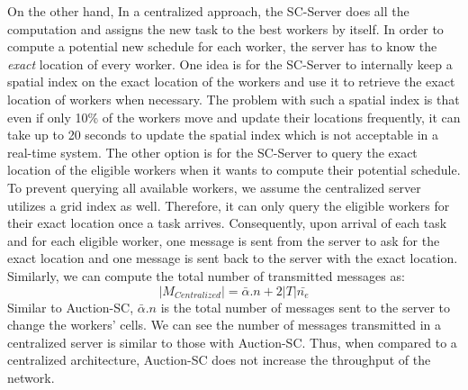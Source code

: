 On the other hand, In a centralized approach, the SC-Server does all the computation and assigns the new task to the best workers by itself. In order to compute a potential new schedule for each worker, the server has to know the \textit{exact} location of every worker. One idea is for the SC-Server to internally keep a spatial index on the exact location of the workers and use it to retrieve the exact location of workers when necessary. The problem with such a spatial index is that even if only 10\% of the workers move and update their locations frequently, it can take up to 20 seconds to update the spatial index \cite{Akdogan14} which is not acceptable in a real-time system. The other option is for the SC-Server to query the exact location of the eligible workers when it wants to compute their potential schedule. To prevent querying all available workers, we assume the centralized server utilizes a grid index as well. Therefore, it can only query the eligible workers for their exact location once a task arrives. Consequently, upon arrival of each task and for each eligible worker, one message is sent from the server to ask for the exact location and one message is sent back to the server with the exact location. Similarly, we can compute the total number of transmitted messages as:
\begin{equation*}
\left| M_{Centralized} \right| = \bar{\alpha}.n + 2|T|\bar{n_e}
\end{equation*}
\noindent Similar to Auction-SC, $\bar{\alpha}.n$ is the total number of messages sent to the server to change the workers' cells. We can see the number of messages transmitted in a centralized server is similar to those with Auction-SC. Thus, when compared to a centralized architecture, Auction-SC does not increase the throughput of the network.